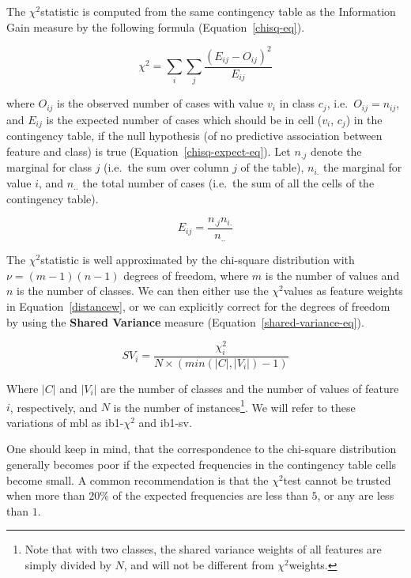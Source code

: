 \documentclass{book}
\newcommand{\chisq}{{$ \chi^2 $}}
\begin{document}
The \chisq statistic is computed from the same contingency table as
the Information Gain measure by the following formula
(Equation~\ref{chisq-eq}).

\begin{equation}
\chi^{2} = \sum_{i} \sum_{j} \frac{(E_{ij} - O_{ij})^{2}}
				  {E_{ij}}
\label{chisq-eq}
\end{equation}

where $O_{ij}$ is the observed number of cases with value $v_{i}$ in
class $c_{j}$, i.e.~$O_{ij} = n_{ij}$, and $E_{ij}$ is the expected
number of cases which should be in cell ($v_{i}$, $c_{j}$) in the
contingency table, if the null hypothesis (of no predictive
association between feature and class) is true
(Equation~\ref{chisq-expect-eq}). Let $n_{.j}$ denote the marginal for
class $j$ (i.e.~the sum over column $j$ of the table), $n_{i.}$ the
marginal for value $i$, and $n_{..}$ the total number of cases
(i.e.~the sum of all the cells of the contingency table).

\begin{equation}
E_{ij} = \frac{n_{.j} n_{i.}}{n_{..}}
\label{chisq-expect-eq}
\end{equation}

The \chisq statistic is well approximated by the chi-square
distribution with $\nu = (m-1)(n-1)$ degrees of freedom, where $m$ is
the number of values and $n$ is the number of classes. We can then
either use the \chisq values as feature weights in
Equation~\ref{distancew}, or we can explicitly correct for the degrees
of freedom by using the {\bf Shared Variance} measure
(Equation~\ref{shared-variance-eq}).

\begin{equation}
SV_{i} = \frac{ \chi^2_{i}}{N \times ( min(|C|,|V_{i}|)-1 ) }
\label{shared-variance-eq}
\end{equation}

Where $|C|$ and $|V_{i}|$ are the number of classes and the number of
values of feature $i$, respectively, and $N$ is the number of
instances\footnote{Note that with two classes, the shared variance
weights of all features are simply divided by $N$, and will not be
different from \chisq weights.}. We will refer to these
variations of {\sc mbl} as {\sc ib1-\chisq} and {\sc ib1-sv}.

One should keep in mind, that the correspondence to the chi-square
distribution generally becomes poor if the expected frequencies in the
contingency table cells become small. A common recommendation is that
the \chisq test cannot be trusted when more than $20\%$ of the
expected frequencies are less than $5$, or any are less than $1$.
\end{document}
